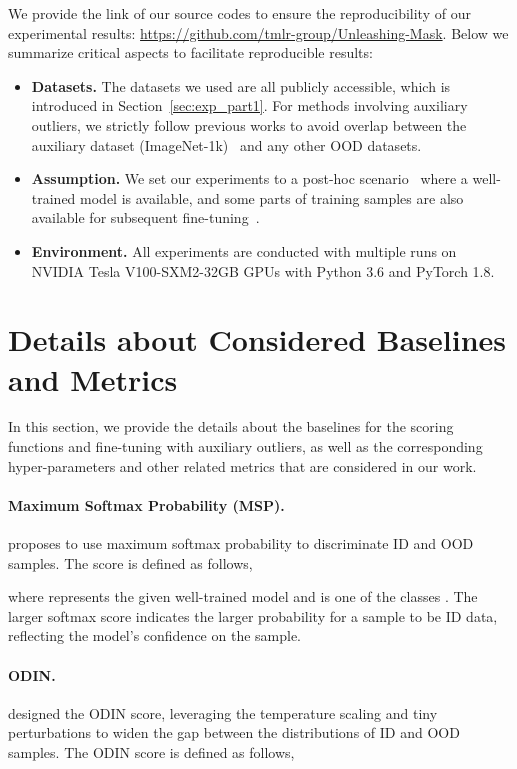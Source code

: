\documentclass{article}
\theoremstyle{plain}
\theoremstyle{definition}
\theoremstyle{remark}
\begin{document}
We provide the link of our source codes to ensure the reproducibility of our experimental results: \url{https://github.com/tmlr-group/Unleashing-Mask}. Below we summarize critical aspects to facilitate reproducible results:

\begin{itemize}
    \item \textbf{Datasets.}  The datasets we used are all publicly accessible, which is introduced in Section~\ref{sec:exp_part1}. For methods involving auxiliary outliers, we strictly follow previous works \citep{sun2021react, du2022vos} to avoid overlap between the auxiliary dataset (ImageNet-1k)~\citep{deng2009imagenet} and any other OOD datasets.
    \item \textbf{Assumption.} We set our experiments to a post-hoc scenario~\citep{liu2020energy} where a well-trained model is available, and some parts of training samples are also available for subsequent fine-tuning~\citep{hendrycks2018deep}.
\item \textbf{Environment.} All experiments are conducted with multiple runs on NVIDIA Tesla V100-SXM2-32GB GPUs with Python 3.6 and PyTorch 1.8.
\end{itemize}



\section{Details about Considered Baselines and Metrics}
\label{app:baseline_info}

In this section, we provide the details about the baselines for the scoring functions and fine-tuning with auxiliary outliers, as well as the corresponding hyper-parameters and other related metrics that are considered in our work.
\paragraph{Maximum Softmax Probability (MSP).} \citep{hendrycks17baseline} proposes to use maximum softmax probability to discriminate ID and OOD samples. The score is defined as follows,

where  represents the given well-trained model and  is one of the classes . The larger softmax score indicates the larger probability for a sample to be ID data, reflecting the model's confidence on the sample. 

\paragraph{ODIN.} \citep{LiangLS18} designed the ODIN score, leveraging the temperature scaling and tiny perturbations to widen the gap between the distributions of ID and OOD samples. The ODIN score is defined as follows,
\end{document}
